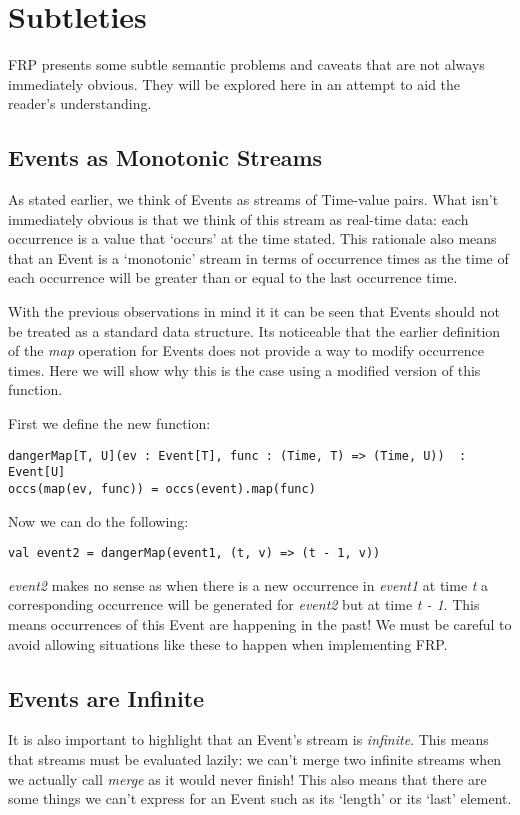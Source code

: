   \section{Subtleties}
    FRP presents some subtle semantic problems and caveats that are not always immediately obvious.
    They will be explored here in an attempt to aid the reader's understanding.
     
    \subsection{Events as Monotonic Streams}
      As stated earlier, we think of Events as streams of Time-value pairs. What isn't immediately
      obvious is that we think of this stream as real-time data: each occurrence is a value that
      `occurs' at the time stated. This rationale also means that an Event is a `monotonic' stream in terms of
      occurrence times as the time of each occurrence will be greater than or equal to the last occurrence
      time.
      
      With the previous observations in mind it it can be seen that Events should not be treated as a
      standard data structure. Its noticeable that the earlier definition of the \emph{map} operation for
      Events does not provide a way to modify occurrence times. Here we will show why this is
      the case using a modified version of this function.
      
      First we define the new function:
      
\begin{verbatim}
dangerMap[T, U](ev : Event[T], func : (Time, T) => (Time, U))  : Event[U]
occs(map(ev, func)) = occs(event).map(func)
\end{verbatim}

      Now we can do the following:
      
\begin{verbatim}
val event2 = dangerMap(event1, (t, v) => (t - 1, v))
\end{verbatim}

      \emph{event2} makes no sense as when there is a new occurrence in \emph{event1} at time 
      \emph{t} a corresponding occurrence will be generated for \emph{event2} but at time 
      \emph{t - 1}. This means occurrences of this Event are happening in the past! We must
      be careful to avoid allowing situations like these to happen when implementing FRP.
      
    \subsection{Events are Infinite}  
      It is also important to highlight that an Event's stream is \emph{infinite}. This means
      that streams must be evaluated lazily: we can't merge two infinite streams when we actually
      call \emph{merge} as it would never finish! This also means that there are some things we
      can't express for an Event such as its `length' or its `last' element.
    
